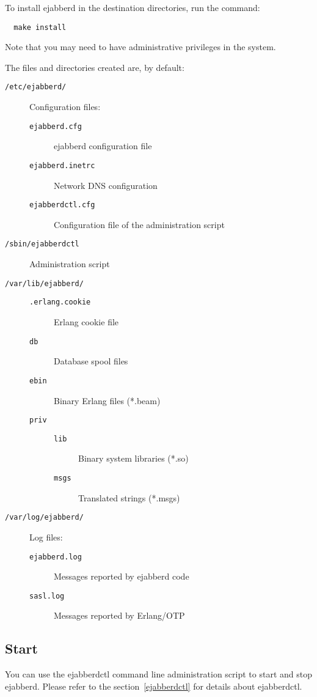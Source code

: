 \documentclass[a4paper,10pt]{book}
\newcommand{\ind}[1]{\begin{latexonly}\index{#1}\end{latexonly}}
\newcommand{\bracehack}{\def\{{\char"7B}\def\}{\char"7D}}
\newcommand{\titem}[1]{\item[\bracehack\texttt{#1}]}
\begin{document}
To install ejabberd in the destination directories, run the command:
\begin{verbatim}
  make install
\end{verbatim}
Note that you may need to have administrative privileges in the system.

The files and directories created are, by default:
\begin{description}
	\titem{/etc/ejabberd/} Configuration files:
		\begin{description}
			\titem{ejabberd.cfg} ejabberd configuration file
			\titem{ejabberd.inetrc} Network DNS configuration
			\titem{ejabberdctl.cfg} Configuration file of the administration script
		\end{description}
	\titem{/sbin/ejabberdctl} Administration script
	\titem{/var/lib/ejabberd/}
		\begin{description}
			\titem{.erlang.cookie} Erlang cookie file
			\titem{db} Database spool files
			\titem{ebin} Binary Erlang files (*.beam)
			\titem{priv}
				\begin{description}
					\titem{lib} Binary system libraries (*.so)
					\titem{msgs} Translated strings (*.msgs)
				\end{description}
		\end{description}
	\titem{/var/log/ejabberd/} Log files:
		\begin{description}
			\titem{ejabberd.log} Messages reported by ejabberd code
			\titem{sasl.log} Messages reported by Erlang/OTP
		\end{description}
\end{description}


\subsection{Start}
\label{start}
\ind{install!start}

You can use the ejabberdctl command line administration script to start and stop ejabberd.
Please refer to the section~\ref{ejabberdctl} for details about ejabberdctl.
\end{document}
